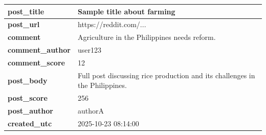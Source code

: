 \documentclass{standalone}
\begin{document}
    \begin{tabular}{|p{3cm}|p{5cm}|}
    \hline
    \textbf{post\_title} & Sample title about farming \\ \hline
    \textbf{post\_url} & https://reddit.com/... \\ \hline
    \textbf{comment} & Agriculture in the Philippines needs reform. \\ \hline
    \textbf{comment\_author} & user123 \\ \hline
    \textbf{comment\_score} & 12 \\ \hline
    \textbf{post\_body} & Full post discussing rice production and its challenges in the Philippines. \\ \hline
    \textbf{post\_score} & 256 \\ \hline
    \textbf{post\_author} & authorA \\ \hline
    \textbf{created\_utc} & 2025-10-23 08:14:00 \\ \hline
    \end{tabular}
\end{document}

